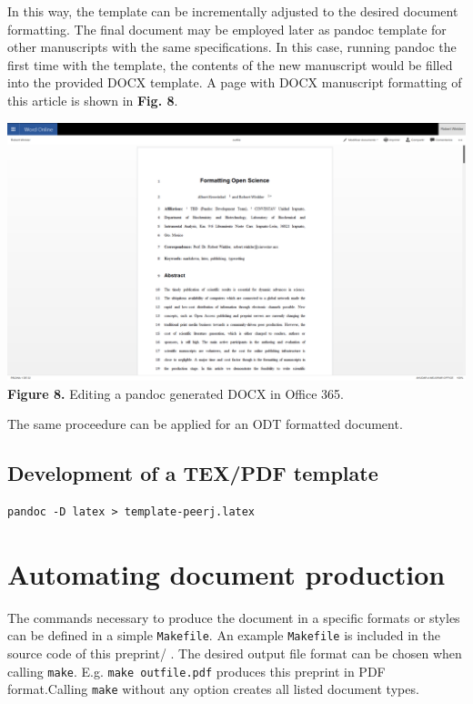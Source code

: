 \documentclass[10pt,fleqn]{wlpeerj}
\begin{document}
In
this
way,
the
template
can
be
incrementally
adjusted
to
the
desired
document
formatting.
The
final
document
may
be
employed
later
as
pandoc
template
for
other
manuscripts
with
the
same
specifications.
In
this
case,
running
pandoc
the
first
time
with
the
template,
the
contents
of
the
new
manuscript
would
be
filled
into
the
provided
DOCX
template.
A
page
with
DOCX
manuscript
formatting
of
this
article
is
shown
in
\textbf{Fig.
8}.

\includegraphics{fig-DOCX-document-in-O365.png}
\textbf{Figure
8.}
Editing
a
pandoc
generated
DOCX
in
Office
365.

The
same
proceedure
can
be
applied
for
an
ODT
formatted
document.

\subsection{Development
of a
TEX/PDF
template}\label{development-of-a-texpdf-template}

\begin{verbatim}
pandoc -D latex > template-peerj.latex
\end{verbatim}

\section{Automating
document
production}\label{automating-document-production}

The
commands
necessary
to
produce
the
document
in a
specific
formats
or
styles
can
be
defined
in a
simple
\texttt{Makefile}.
An
example
\texttt{Makefile}
is
included
in
the
source
code
of
this
preprint/
. The
desired
output
file
format
can
be
chosen
when
calling
\texttt{make}.
E.g.
\texttt{make\ outfile.pdf}
produces
this
preprint
in
PDF
format.Calling
\texttt{make}
without
any
option
creates
all
listed
document
types.
\end{document}

